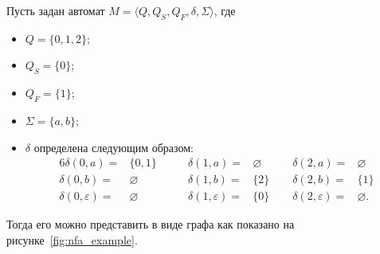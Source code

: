 \begin{example}\label{example:NFA}
    Пусть задан автомат $M=\langle Q, Q_S, Q_F, \delta, \Sigma\rangle$, где
    \begin{itemize}
        \item $Q = \{0,1,2\}$;
        \item $Q_S = \{0\}$;
        \item $Q_F = \{1\}$;
        \item $\Sigma = \{a,b\}$;
        \item $\delta$ определена следующим образом:
        \begin{alignat*}{6}
            \delta(0,a) =& \{0,1\}      \qquad    & \delta(1,a) =& \varnothing \qquad & \delta(2,a) =& \varnothing \\
            \delta(0,b) =& \varnothing           & \delta(1,b) =& \{2\}             & \delta(2,b) =& \{1\} \\
            \delta(0,\varepsilon) =& \varnothing & \delta(1,\varepsilon) =& \{0\}   & \delta(2,\varepsilon) =& \varnothing.
        \end{alignat*}
    \end{itemize}
    Тогда его можно представить в виде графа как показано на рисунке~\ref{fig:nfa_example}.
    \begin{marginfigure}
        \begin{center}
        \end{center}
        \caption{Пример конечного автомата в котором состояние $0$~--- стартовое, а состояние $1$~--- финальное}
        \label{fig:nfa_example}
    \end{marginfigure}
\end{example}

